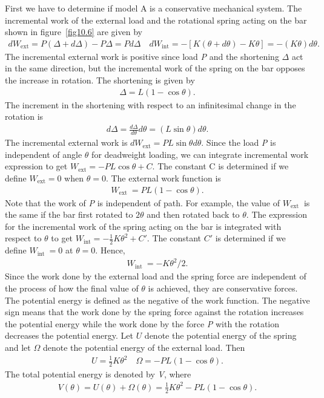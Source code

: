 \documentclass{AeroStructure-ERJohnson}
\begin{document}
First we have to determine if model A is a conservative mechanical system. The incremental work of the external load and the rotational spring acting on the bar shown in figure~\ref{fig10.6} are given by
\begin{align}\label{eq10.21}
d W_{\mathrm{ext}}=P(\Delta+d \Delta)-P \Delta=P d \Delta \quad d W_{\mathrm{int}}=-[K(\theta+d \theta)-K \theta]=-(K \theta) d \theta.
\end{align}
\noindent
The incremental external work is positive since load \textit{P} and the shortening $\Delta$ act in the same direction, but the incremental work of the spring on the bar opposes the increase in rotation. The shortening is given by
\begin{align}\label{eq10.22}
\Delta=L(1-\cos \theta).
\end{align}
The increment in the shortening with respect to an infinitesimal change in the rotation is
\begin{align}\label{eq10.23}
d \Delta=\frac{d \Delta}{d \theta} d \theta=(L \sin \theta) d \theta.
\end{align}
The incremental external work is $d W_{\mathrm{ext}}=P L \sin \theta d \theta$. Since the load \textit{P} is independent of angle $\theta$ for deadweight loading, we can integrate incremental work expression to get $W_{\mathrm{ext}}=-P L \cos \theta+C$. The constant C is determined if we define $W_{\text {ext}}=0$ when $\theta = 0$. The external work function is
\begin{align}\label{eq10.24}
W_{\text {ext }}=P L(1-\cos \theta).
\end{align}
Note that the work of \textit{P} is independent of path. For example, the value of $W_{\text {ext }}$ is the same if the bar first rotated to $2\theta$ and then rotated back to $\theta$. The expression for the incremental work of the spring acting on the bar is integrated with respect to $\theta$ to get $W_{\text {int}}=-\frac{1}{2} K \theta^{2}+C'$. The constant $C'$ is determined if we define $W_{\text {int }}=0$ at $\theta = 0$. Hence,
\begin{align}\label{eq10.25}
W_{\text {int }}=-K \theta^{2} / 2.
\end{align}
Since the work done by the external load and the spring force are independent of the process of how the final value of $\theta$ is achieved, they are conservative forces. The potential energy is defined as the negative of the work function. The negative sign means that the work done by the spring force against the rotation increases the potential energy while the work done by the force \textit{P} with the rotation decreases the potential energy. Let $U$ denote the potential energy of the spring and let $\Omega$ denote the potential energy of the external load. Then
\begin{align}\label{eq10.26}
U=\frac{1}{2} K \theta^{2} \quad \Omega=-P L(1-\cos \theta).
\end{align}
The total potential energy is denoted by \textit{V}, where
\begin{align}\label{eq10.27}
V(\theta)=U(\theta)+\Omega(\theta)=\frac{1}{2} K \theta^{2}-P L(1-\cos \theta).
\end{align}
\end{document}
